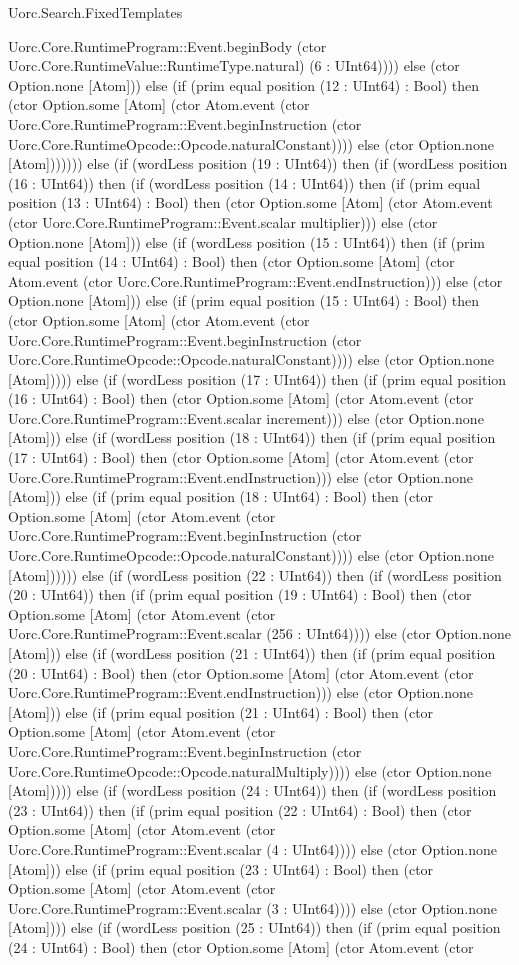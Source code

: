 \begin{lexlean}{Uorc.Search.FixedTemplates}
\begin{semanticmodule}
{Uorc.Core.RuntimeProgram::Event.beginBody (ctor Uorc.Core.RuntimeValue::RuntimeType.natural) (6 : UInt64)))) else (ctor Option.none [Atom])) else (if (prim equal position (12 : UInt64) : Bool) then (ctor Option.some [Atom] (ctor Atom.event (ctor Uorc.Core.RuntimeProgram::Event.beginInstruction (ctor Uorc.Core.RuntimeOpcode::Opcode.naturalConstant)))) else (ctor Option.none [Atom])))))) else (if (wordLess position (19 : UInt64)) then (if (wordLess position (16 : UInt64)) then (if (wordLess position (14 : UInt64)) then (if (prim equal position (13 : UInt64) : Bool) then (ctor Option.some [Atom] (ctor Atom.event (ctor Uorc.Core.RuntimeProgram::Event.scalar multiplier))) else (ctor Option.none [Atom])) else (if (wordLess position (15 : UInt64)) then (if (prim equal position (14 : UInt64) : Bool) then (ctor Option.some [Atom] (ctor Atom.event (ctor Uorc.Core.RuntimeProgram::Event.endInstruction))) else (ctor Option.none [Atom])) else (if (prim equal position (15 : UInt64) : Bool) then (ctor Option.some [Atom] (ctor Atom.event (ctor Uorc.Core.RuntimeProgram::Event.beginInstruction (ctor Uorc.Core.RuntimeOpcode::Opcode.naturalConstant)))) else (ctor Option.none [Atom])))) else (if (wordLess position (17 : UInt64)) then (if (prim equal position (16 : UInt64) : Bool) then (ctor Option.some [Atom] (ctor Atom.event (ctor Uorc.Core.RuntimeProgram::Event.scalar increment))) else (ctor Option.none [Atom])) else (if (wordLess position (18 : UInt64)) then (if (prim equal position (17 : UInt64) : Bool) then (ctor Option.some [Atom] (ctor Atom.event (ctor Uorc.Core.RuntimeProgram::Event.endInstruction))) else (ctor Option.none [Atom])) else (if (prim equal position (18 : UInt64) : Bool) then (ctor Option.some [Atom] (ctor Atom.event (ctor Uorc.Core.RuntimeProgram::Event.beginInstruction (ctor Uorc.Core.RuntimeOpcode::Opcode.naturalConstant)))) else (ctor Option.none [Atom]))))) else (if (wordLess position (22 : UInt64)) then (if (wordLess position (20 : UInt64)) then (if (prim equal position (19 : UInt64) : Bool) then (ctor Option.some [Atom] (ctor Atom.event (ctor Uorc.Core.RuntimeProgram::Event.scalar (256 : UInt64)))) else (ctor Option.none [Atom])) else (if (wordLess position (21 : UInt64)) then (if (prim equal position (20 : UInt64) : Bool) then (ctor Option.some [Atom] (ctor Atom.event (ctor Uorc.Core.RuntimeProgram::Event.endInstruction))) else (ctor Option.none [Atom])) else (if (prim equal position (21 : UInt64) : Bool) then (ctor Option.some [Atom] (ctor Atom.event (ctor Uorc.Core.RuntimeProgram::Event.beginInstruction (ctor Uorc.Core.RuntimeOpcode::Opcode.naturalMultiply)))) else (ctor Option.none [Atom])))) else (if (wordLess position (24 : UInt64)) then (if (wordLess position (23 : UInt64)) then (if (prim equal position (22 : UInt64) : Bool) then (ctor Option.some [Atom] (ctor Atom.event (ctor Uorc.Core.RuntimeProgram::Event.scalar (4 : UInt64)))) else (ctor Option.none [Atom])) else (if (prim equal position (23 : UInt64) : Bool) then (ctor Option.some [Atom] (ctor Atom.event (ctor Uorc.Core.RuntimeProgram::Event.scalar (3 : UInt64)))) else (ctor Option.none [Atom]))) else (if (wordLess position (25 : UInt64)) then (if (prim equal position (24 : UInt64) : Bool) then (ctor Option.some [Atom] (ctor Atom.event (ctor }
\end{semanticmodule}
\end{lexlean}
